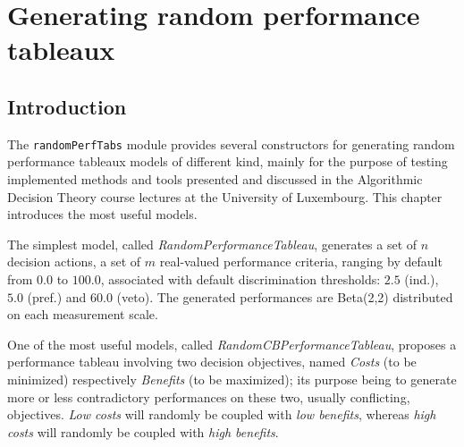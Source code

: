 \chapter{Generating random performance tableaux}
\label{sec:6}



\section{Introduction}
\label{sec:6.1}

The {\tt randomPerfTabs} module provides several constructors for generating random performance tableaux models of different kind, mainly for the purpose of testing implemented methods and tools presented and discussed in the Algorithmic Decision Theory course lectures at the University of Luxembourg. This chapter introduces the most useful models.

The simplest model, called \emph{RandomPerformanceTableau}, generates a set of $n$ decision actions, a set of $m$ real-valued performance criteria, ranging by default from $0.0$ to $100.0$, associated with default discrimination thresholds: $2.5$ (ind.), $5.0$ (pref.) and $60.0$ (veto). The generated performances are Beta(2,2) distributed on each measurement scale.

One of the most useful models, called \emph{RandomCBPerformanceTableau}, proposes a performance tableau involving two decision objectives, named \emph{Costs} (to be minimized) respectively \emph{Benefits} (to be maximized); its purpose being to generate more or less contradictory performances on these two, usually conflicting, objectives. \emph{Low costs} will randomly be coupled with \emph{low benefits}, whereas \emph{high costs} will randomly be coupled with \emph{high benefits}.

